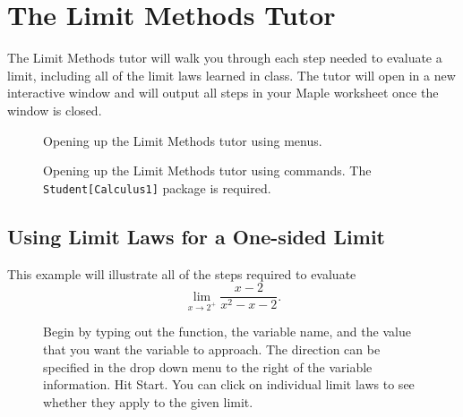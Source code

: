\section{The Limit Methods Tutor}
\label{sec:limitmethodstutor}

The Limit Methods tutor will walk you through each step needed to evaluate a limit, including all of the limit laws learned in class. The tutor will open in a new interactive window and will output all steps in your Maple worksheet once the window is closed.

\begin{figure}[h]
\caption{Opening up the Limit Methods tutor using menus.}
\centering
{}
\end{figure}

\begin{figure}[h]
\caption{Opening up the Limit Methods tutor using commands. The \texttt{Student[Calculus1]} package is required.}
\centering
{}
\end{figure}

\newpage

\subsection{Using Limit Laws for a One-sided Limit}

This example will illustrate all of the steps required to evaluate \[ \displaystyle\lim_{x \rightarrow 2^+} \frac{x-2}{x^2-x-2}. \]
\begin{figure}[h]
\caption{Begin by typing out the function, the variable name, and the value that you want the variable to approach. The direction can be specified in the drop down menu to the right of the variable information. Hit Start. You can click on individual limit laws to see whether they apply to the given limit.}
\centering
{}
\vspace{-1cm}
\end{figure}

